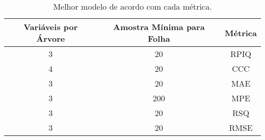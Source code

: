 \begin{table}

\caption{\label{tab:tabela_metricas}Melhor modelo de acordo com cada métrica. }
\centering
\begin{tabular}[t]{c|c|c}
\hline
Variáveis por Árvore & Amostra Mínima para Folha & Métrica\\
\hline
3 & 20 & RPIQ\\
\hline
4 & 20 & CCC\\
\hline
3 & 20 & MAE\\
\hline
3 & 200 & MPE\\
\hline
3 & 20 & RSQ\\
\hline
3 & 20 & RMSE\\
\hline
\end{tabular}
\end{table}
